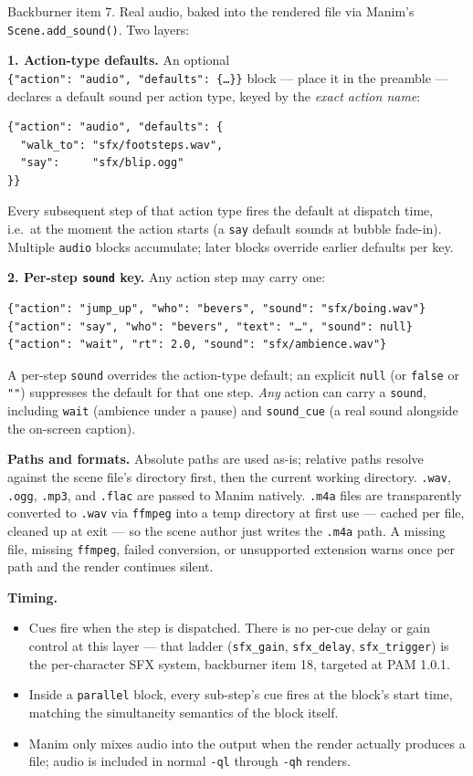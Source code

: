 \documentclass[
  12pt,
  letterpaper,
]{book}
\begin{document}
Backburner item 7. Real audio, baked into the rendered file via
Manim's \texttt{Scene.add\_sound()}. Two layers:

\textbf{1. Action-type defaults.} An optional
\texttt{\{"action":\ "audio",\ "defaults":\ \{…\}\}} block --- place
it in the preamble --- declares a default sound per action type,
keyed by the \emph{exact action name}:

\begin{verbatim}
{"action": "audio", "defaults": {
  "walk_to": "sfx/footsteps.wav",
  "say":     "sfx/blip.ogg"
}}
\end{verbatim}

Every subsequent step of that action type fires the default at
dispatch time, i.e.\ at the moment the action starts (a \texttt{say}
default sounds at bubble fade-in). Multiple \texttt{audio} blocks
accumulate; later blocks override earlier defaults per key.

\textbf{2. Per-step \texttt{sound} key.} Any action step may carry
one:

\begin{verbatim}
{"action": "jump_up", "who": "bevers", "sound": "sfx/boing.wav"}
{"action": "say", "who": "bevers", "text": "…", "sound": null}
{"action": "wait", "rt": 2.0, "sound": "sfx/ambience.wav"}
\end{verbatim}

A per-step \texttt{sound} overrides the action-type default; an
explicit \texttt{null} (or \texttt{false} or \texttt{""}) suppresses
the default for that one step. \emph{Any} action can carry a
\texttt{sound}, including \texttt{wait} (ambience under a pause) and
\texttt{sound\_cue} (a real sound alongside the on-screen caption).

\textbf{Paths and formats.} Absolute paths are used as-is; relative
paths resolve against the scene file's directory first, then the
current working directory. \texttt{.wav}, \texttt{.ogg},
\texttt{.mp3}, and \texttt{.flac} are passed to Manim natively.
\texttt{.m4a} files are transparently converted to \texttt{.wav} via
\texttt{ffmpeg} into a temp directory at first use --- cached per
file, cleaned up at exit --- so the scene author just writes the
\texttt{.m4a} path. A missing file, missing \texttt{ffmpeg}, failed
conversion, or unsupported extension warns once per path and the
render continues silent.

\textbf{Timing.}

\begin{itemize}
\item
  Cues fire when the step is dispatched. There is no per-cue delay or
  gain control at this layer --- that ladder
  (\texttt{sfx\_gain}, \texttt{sfx\_delay}, \texttt{sfx\_trigger}) is
  the per-character SFX system, backburner item 18, targeted at
  PAM 1.0.1.
\item
  Inside a \texttt{parallel} block, every sub-step's cue fires at the
  block's start time, matching the simultaneity semantics of the
  block itself.
\item
  Manim only mixes audio into the output when the render actually
  produces a file; audio is included in normal \texttt{-ql} through
  \texttt{-qh} renders.
\end{itemize}
\end{document}
